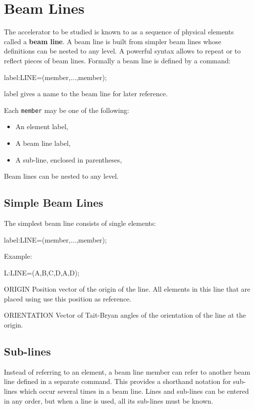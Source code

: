 

\chapter{Beam Lines}
\label{chp:lines}

\label{sec:line}

The accelerator to be studied is known to \opal
as a sequence of physical elements called a \textbf{beam line}.
A beam line is built from simpler beam lines whose definitions
can be nested to any level.
A powerful syntax allows to repeat or to reflect pieces of beam lines.
Formally a beam line is defined by a  command:
\begin{example}
label:LINE=(member,...,member);
\end{example}
{label}  gives a name to the beam line
for later reference.

Each \texttt{member} may be one of the following:
\begin{itemize}
\item An element label,
\item A beam line label,
\item A sub-line, enclosed in parentheses,
\end{itemize}
Beam lines can be nested to any level.

\section{Simple Beam Lines}
\label{sec:line:simple}
The simplest beam line consists of single elements:
\begin{example}
label:LINE=(member,...,member);
\end{example}
Example:
\begin{example}
L:LINE=(A,B,C,D,A,D);
\end{example}

\begin{kdescription}
\item[ORIGIN] Position vector of the origin of the line. All elements in this line that are placed using  use this position as reference.
\item[ORIENTATION] Vector of Tait-Bryan angles \cite{bib:tait-bryan} of the orientation of the line at the origin.
\end{kdescription}

\section{Sub-lines}
\label{sec:subline}
Instead of referring to an element,
a beam line member can refer to another beam line
defined in a separate command.
This provides a shorthand notation for sub-lines which occur
several times in a beam line.
Lines and sub-lines can be entered in any order,
but when a line is used,
all its sub-lines must be known.

